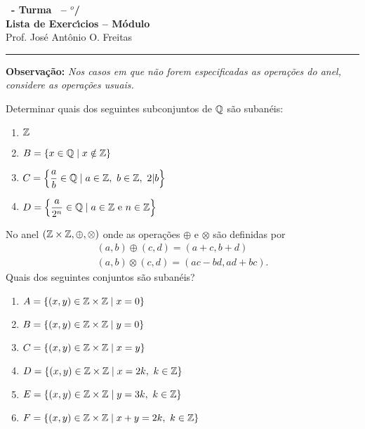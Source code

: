 \documentclass[12pt]{exam}
\begin{document}
    \begin{center}
    {\Large\bf \disciplina\ - Turma \turma\ -- \semestre$^{o}$/\ano} \\ \vspace{9pt} {\large\bf
        Lista de Exerc{\'\i}cios -- Módulo \numeromodulo}\\ \vspace{9pt} Prof. Jos{\'e} Ant{\^o}nio O. Freitas
    \end{center}

    \hrule

    \vspace{.6cm}

    \textbf{Observação: }\textit{Nos casos em que n\~ao forem especificadas as opera\c{c}\~oes do anel, considere as opera\c{c}\~oes usuais.}

    \vspace{.6cm}

    \questao{} Determinar quais dos seguintes subconjuntos de $\mathbb{Q}$ s{\~a}o suban{\'e}is:
        \begin{multicols}{2}
            \begin{enumerate}[label=({\alph*})]
                \item $\mathbb{Z}$
                \item $B = \{x \in \mathbb{Q} \mid x \notin \mathbb{Z}\}$
                \item $C = \left\{\dfrac{a}{b} \in \mathbb{Q} \mid a \in \mathbb{Z},\ b \in \mathbb{Z},\ 2 |b \right\}$
                \item $D = \left\{\dfrac{a}{2^n} \in \mathbb{Q} \mid a \in \mathbb{Z} \mbox{ e } n \in \mathbb{Z} \right\}$
            \end{enumerate}
        \end{multicols}

    \vspace{.3cm}

    \questao{} No anel $(\mathbb{Z} \times \mathbb{Z}, \oplus, \otimes)$ onde as opera\c{c}\~oes $\oplus$ e $\otimes$ s\~ao definidas por
    \begin{align*}
        (a, b) \oplus (c, d) = (a + c, b + d)\\
        (a ,b) \otimes (c, d) = (ac - bd, ad + bc).
    \end{align*}
    Quais dos seguintes conjuntos s\~ao suban\'eis?
    \begin{enumerate}[label=({\alph*})]
        \item $A = \{(x, y) \in \mathbb{Z} \times \mathbb{Z} \mid x = 0\}$
        \item $B = \{(x, y) \in \mathbb{Z} \times \mathbb{Z} \mid y = 0\}$
        \item $C = \{(x, y) \in \mathbb{Z} \times \mathbb{Z} \mid x = y\}$
        \item $D = \{(x, y) \in \mathbb{Z} \times \mathbb{Z} \mid x = 2k,\ k \in \mathbb{Z}\}$
        \item $E = \{(x, y) \in \mathbb{Z} \times \mathbb{Z} \mid y = 3k,\ k \in \mathbb{Z}\}$
        \item $F = \{(x, y) \in \mathbb{Z} \times \mathbb{Z} \mid x + y = 2k,\ k \in \mathbb{Z}\}$
    \end{enumerate}
\end{document}
